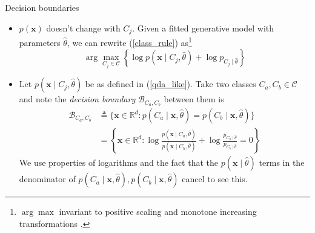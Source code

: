 \documentclass{beamer}
\numberwithin{equation}{section}
\newcommand{\aref}[1]{\alert{\ref{#1}}}
\begin{document}
\begin{frame}{Decision boundaries}
    \begin{itemize}
        \item
        $ p(\mathbf{x}) $ doesn't change with $ C_j $. Given a fitted
        generative model with parameters $ \hat{\theta} $, we can rewrite
        (\aref{class_rule}) as\footnote{
            $ \arg\max $ invariant to positive scaling and monotone
            increasing transformations \cite{bv_convex_opt}.
        }
        \begin{equation*}
            \arg\max_{C_j \in \mathcal{C}}\left\{
                \log p(\mathbf{x} \mid C_j, \hat{\theta}) +
                \log p_{C_j \mid \hat{\theta}}
            \right\}
        \end{equation*}

        \item
        Let $ p(\mathbf{x} \mid C_j, \hat{\theta}) $ be as defined in
        (\aref{qda_like}). Take two classes $ C_a, C_b \in \mathcal{C} $ and
        note the \textit{decision boundary} $ \mathcal{B}_{C_a, C_b} $ between
        them is
        \begin{equation} \label{decision_boundary}
            \begin{split}
            \mathcal{B}_{C_a, C_b} & \triangleq \big\{
                \mathbf{x} \in \mathbb{R}^d :
                p(C_a \mid \mathbf{x}, \hat{\theta}) =
                p(C_b \mid \mathbf{x}, \hat{\theta})
            \big\} \\ & =
                \left\{
                    \mathbf{x} \in \mathbb{R}^d : \log\frac{
                        p(\mathbf{x} \mid C_a, \hat{\theta})
                    }{p(\mathbf{x} \mid C_b, \hat{\theta})} + \log\frac{
                        p_{C_a \mid \hat{\theta}}
                    }{p_{C_b \mid \hat{\theta}}} = 0
                \right\}
            \end{split}
        \end{equation}
        We use properties of logarithms and the fact that the
        $ p(\mathbf{x} \mid \hat{\theta}) $ terms in the denominator of
        $ p(C_a \mid \mathbf{x}, \hat{\theta}), p(C_b \mid \mathbf{x},
        \hat{\theta}) $ cancel to see this.
    \end{itemize}

    \medskip
\end{frame}
\end{document}
